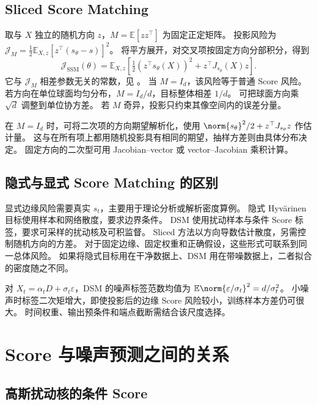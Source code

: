 \subsection{Sliced Score Matching}

取与 \(X\) 独立的随机方向 \(z\)，\(M=\mathbb E[zz^\top]\) 为固定正定矩阵。
投影风险为 \(\mathcal J_M=\frac12\mathbb E_{X,z}[z^\top(s_\theta-s)]^2\)。
将平方展开，对交叉项按固定方向分部积分，得到
\begin{equation}
 \mathcal J_{\mathrm{SSM}}(\theta)=
 \mathbb E_{X,z}\left[\tfrac12(z^\top s_\theta(X))^2+
                              z^\top J_{s_\theta}(X)z\right].
 \label{eq:fields-sliced}
\end{equation}
它与 \(\mathcal J_M\) 相差参数无关的常数，见 \cite{song2019sliced}。
当 \(M=I_d\)，该风险等于普通 Score 风险。
若方向在单位球面均匀分布，\(M=I_d/d\)，目标整体相差 \(1/d\)。
可把球面方向乘 \(\sqrt d\) 调整到单位协方差。
若 \(M\) 奇异，投影只约束其像空间内的误差分量。

在 \(M=I_d\) 时，可将二次项的方向期望解析化，使用
\(\norm{s_\theta}^2/2+z^\top J_{s_\theta}z\) 作估计量。
这与在所有项上都用随机投影具有相同的期望，抽样方差则由具体分布决定。
固定方向的二次型可用 Jacobian--vector 或 vector--Jacobian 乘积计算。

\subsection{隐式与显式 Score Matching 的区别}

显式边缘风险需要真实 \(s_t\)，主要用于理论分析或解析密度算例。
隐式 Hyvärinen 目标使用样本和网络散度，要求边界条件。
DSM 使用扰动样本与条件 Score 标签，要求可采样的扰动核及可积监督。
Sliced 方法以方向导数估计散度，另需控制随机方向的方差。
对于固定边缘、固定权重和正确假设，这些形式可联系到同一总体风险。
如果将隐式目标用在干净数据上、DSM 用在带噪数据上，二者拟合的密度随之不同。

对 \(X_t=\alpha_tD+\sigma_t\varepsilon\)，DSM 的噪声标签范数均值为
\(\mathbb E\norm{\varepsilon/\sigma_t}^2=d/\sigma_t^2\)。
小噪声时标签二次矩增大，即使投影后的边缘 Score 风险较小，训练样本方差仍可很大。
时间权重、输出预条件和端点截断需结合该尺度选择。

\section{Score 与噪声预测之间的关系}
\label{sec:fields-noise}

\subsection{高斯扰动核的条件 Score}

